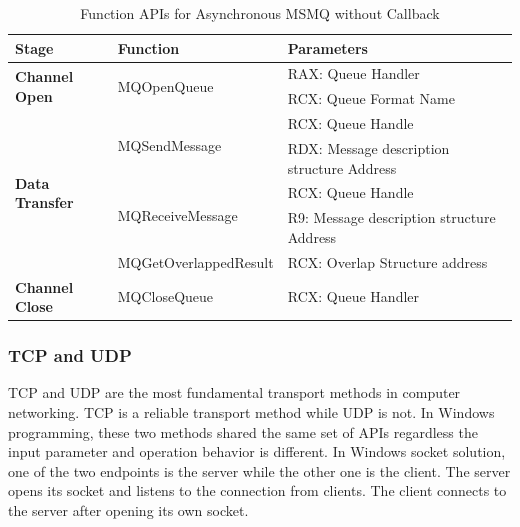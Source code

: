     \begin{table}[H]
        \centering
        \caption{Function APIs for Asynchronous MSMQ without Callback}
        \label{msmqasynfunctions}
        \begin{tabular}{|l|l|l|}
            \hline
             \textbf{Stage} & \textbf{Function}& \textbf{Parameters}  \\
             \hline
             \multirow{2}{*}{{\textbf{Channel Open}}}
             &\multirow{2}{*}{{MQOpenQueue}} &  RAX: Queue Handler\\
              \cline{3-3} 
             & &  RCX: Queue Format Name\\
            \hline
             \multirow{5}{*}{{\textbf{Data Transfer}}}
             &\multirow{2}{*}{MQSendMessage} &  RCX: Queue Handle \\
              \cline{3-3} 
             &&  RDX: Message description structure Address \\
            \cline{2-3}
             & \multirow{2}{*}{MQReceiveMessage}&  RCX: Queue Handle \\
              \cline{3-3} 
              &&  R9: Message description structure Address \\
                          \cline{2-3}
                          
              & MQGetOverlappedResult &  RCX: Overlap Structure address  \\
            \hline
            \textbf{Channel Close} &MQCloseQueue & RCX: Queue Handler \\
            \hline
        \end{tabular}
    \end{table}
    
\subsubsection{TCP and UDP}
TCP and UDP are the most fundamental transport methods in computer networking. TCP is a reliable transport method while UDP is not. In Windows programming, these two methods shared the same set of APIs regardless the input parameter and operation behavior is different. In Windows socket solution, one of the two endpoints is the server while the other one is the client. The server opens its socket and listens to the connection from clients. The client connects to the server after opening its own socket. 

